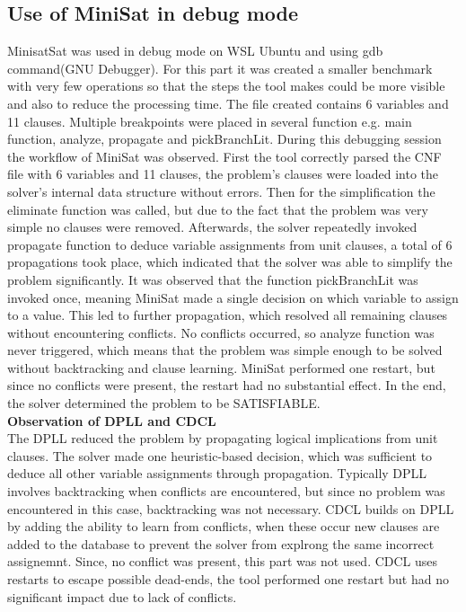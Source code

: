 \documentclass[runningheads]{llncs}
\begin{document}
 \subsection{Use of MiniSat in debug mode}
MinisatSat was used in debug mode on WSL Ubuntu and using gdb command(GNU Debugger). For this part it was created a smaller benchmark with very few operations so that the steps the tool makes could be more visible and also to reduce the processing time. The file created contains 6 variables and 11 clauses.
Multiple breakpoints were placed in several function e.g. main function, analyze, propagate and pickBranchLit. During this debugging session the workflow of MiniSat was observed. First the tool correctly parsed the CNF file with 6 variables and 11 clauses, the problem's clauses were loaded into the solver's internal data structure without errors. Then for the simplification the eliminate function was called, but due to the fact that the problem was very simple no clauses were removed. Afterwards, the solver repeatedly invoked propagate function to deduce variable assignments from unit clauses, a total of 6 propagations took place, which indicated that the solver was able to simplify the problem significantly. It was observed that the function pickBranchLit was invoked once, meaning MiniSat made a single decision on which variable to assign to a value. This led to further propagation, which resolved all remaining clauses without encountering conflicts. No conflicts occurred, so analyze function was never triggered, which means that the problem was simple enough to be solved without backtracking and clause learning. MiniSat performed one restart, but since no conflicts were present, the restart had no substantial effect. In the end, the solver determined the problem to be SATISFIABLE.
\\
\textbf{Observation of DPLL and CDCL}
\\
The DPLL reduced the problem by propagating logical implications from unit clauses. The solver made one heuristic-based decision, which was sufficient to deduce all other variable assignments through propagation. Typically DPLL involves backtracking when conflicts are encountered, but since no problem was encountered in this case, backtracking was not necessary. CDCL builds on DPLL by adding the ability to learn from conflicts, when these occur new clauses are added to the database to prevent the solver from explrong the same incorrect assignemnt. Since, no conflict was present, this part was not used. CDCL uses restarts to escape possible dead-ends, the tool performed one restart but had no significant impact due to lack of conflicts. 
\end{document}
